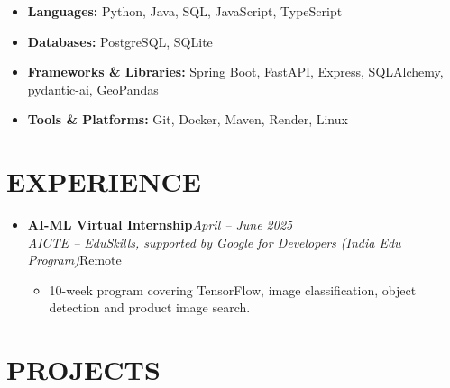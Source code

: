 \documentclass[11pt,a4paper]{article}
\newcommand{\resumeSubheading}[4]{%
    \item[]
    \noindent
    \textbf{#1}\hfill\textit{#2}\\
    \textit{\small #3}\hfill\small #4
    \par\vspace{0.8pt}
}
\newcommand{\resumeItem}[1]{%
    \item\small #1
}
\begin{document}
\begin{itemize}[leftmargin=0pt]

\item[]\small{\textbf{Languages:} Python, Java, SQL, JavaScript, TypeScript}
\vspace{1.5pt}
\item[]\small{\textbf{Databases:} PostgreSQL, SQLite}
\vspace{1.5pt}
\item[]\small{\textbf{Frameworks \& Libraries:} Spring Boot, FastAPI, Express, SQLAlchemy, pydantic-ai, GeoPandas}
\vspace{1.5pt}
\item[]\small{\textbf{Tools \& Platforms:} Git, Docker, Maven, Render, Linux}

\end{itemize}


\section{EXPERIENCE}

\begin{itemize}[leftmargin=0pt]

\resumeSubheading
{AI-ML Virtual Internship}
{April -- June 2025}
{AICTE -- EduSkills, supported by Google for Developers (India Edu Program)}
{Remote}

\begin{itemize}

\resumeItem{
10-week program covering TensorFlow, image classification, object detection and product image search.
}

\end{itemize}

\end{itemize}


\section{PROJECTS}
\end{document}
